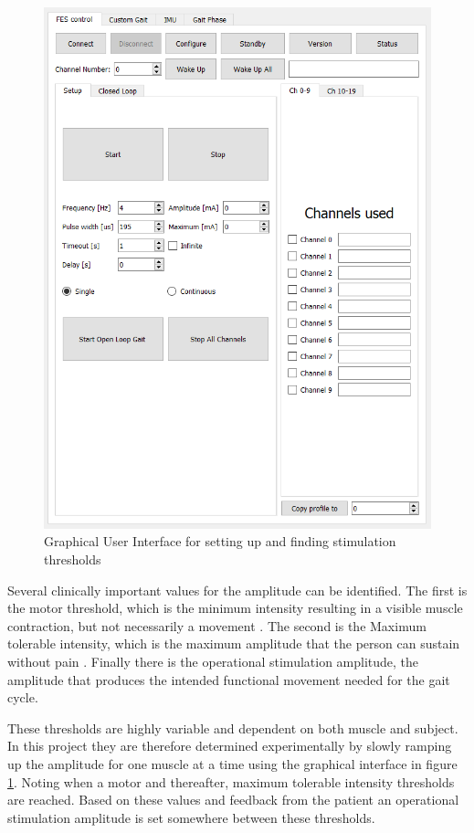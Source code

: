 \begin{figure} [h]
    \centering
    \includegraphics[width=0.65\linewidth]{images/setupgui.png}
    \caption{Graphical User Interface for setting up and finding stimulation thresholds}
    \label{fig:setupgui}
\end{figure}

Several clinically important values for the amplitude can be identified. The first is the motor threshold, which is the minimum intensity resulting in a visible muscle contraction, but not necessarily a movement \cite{marquez-chin_functional_2020}. The second is the Maximum tolerable intensity, which is the maximum amplitude that the person can sustain without pain \cite{marquez-ching_funcitonal_2020}. Finally there is the operational stimulation amplitude, the amplitude that produces the intended functional movement needed for the gait cycle. 

These thresholds are highly variable and dependent on both muscle and subject. In this project they are therefore determined experimentally by slowly ramping up the amplitude for one muscle at a time using the graphical interface in figure \ref{fig:setupgui}. Noting when a motor and thereafter, maximum tolerable intensity thresholds are reached. Based on these values and feedback from the patient an operational stimulation amplitude is set somewhere between these thresholds. 


